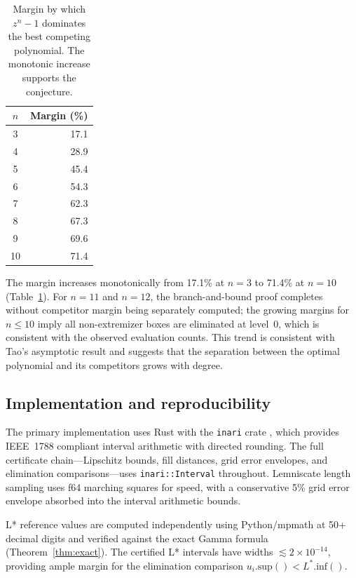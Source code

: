 \documentclass[11pt]{article}
\theoremstyle{plain}
\theoremstyle{definition}
\theoremstyle{remark}
\begin{document}
\begin{table}[ht]
\centering
\caption{Margin by which $z^n - 1$ dominates the best competing polynomial. The monotonic increase supports the conjecture.}
\label{tab:margins}
\begin{tabular}{cr}
\toprule
$n$ & \textbf{Margin (\%)} \\
\midrule
3 & 17.1 \\
4 & 28.9 \\
5 & 45.4 \\
6 & 54.3 \\
7 & 62.3 \\
8 & 67.3 \\
9 & 69.6 \\
10 & 71.4 \\
\bottomrule
\end{tabular}
\end{table}

The margin increases monotonically from 17.1\% at $n=3$ to 71.4\% at $n=10$ (Table~\ref{tab:margins}). For $n = 11$ and $n = 12$, the branch-and-bound proof completes without competitor margin being separately computed; the growing margins for $n \leq 10$ imply all non-extremizer boxes are eliminated at level~0, which is consistent with the observed evaluation counts. This trend is consistent with Tao's asymptotic result and suggests that the separation between the optimal polynomial and its competitors grows with degree.

\subsection{Implementation and reproducibility}
\label{sec:crossval}

The primary implementation uses Rust with the \texttt{inari} crate \cite{inari}, which provides IEEE~1788 compliant interval arithmetic with directed rounding. The full certificate chain---Lipschitz bounds, fill distances, grid error envelopes, and elimination comparisons---uses \texttt{inari::Interval} throughout. Lemniscate length sampling uses f64 marching squares for speed, with a conservative 5\% grid error envelope absorbed into the interval arithmetic bounds.

L* reference values are computed independently using Python/mpmath at 50+ decimal digits and verified against the exact Gamma formula (Theorem~\ref{thm:exact}). The certified L* intervals have widths $\lesssim 2 \times 10^{-14}$, providing ample margin for the elimination comparison $u_i.\mathrm{sup}() < L^*.\mathrm{inf}()$.
\end{document}
